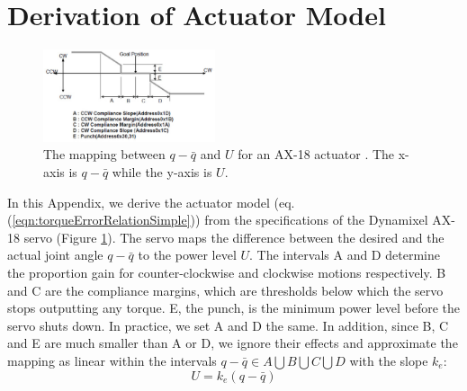 \section{Derivation of Actuator Model}

\begin{figure}[t]
\centering
\includegraphics[width=0.45\textwidth]{figures/ax18gain.eps}
\caption{The mapping between $q-\bar{q}$ and $U$ for an AX-18 actuator \cite{AX18:2015}. The x-axis is $q-\bar{q}$ while the y-axis is $U$.}
\vspace{-0.1in}
\label{fig:actuatorMap}
\end{figure}

In this Appendix, we derive the actuator model (eq.(\ref{eqn:torqueErrorRelationSimple})) from the specifications of the Dynamixel AX-18 servo (Figure \ref{fig:actuatorMap}). The servo maps the difference between the desired and the actual joint angle $q-\bar{q}$ to the power level $U$. The intervals A and D determine the proportion gain for counter-clockwise and clockwise motions respectively. B and C are the compliance margins, which are thresholds below which the servo stops outputting any torque. E, the punch, is the minimum power level before the servo shuts down. In practice, we set A and D the same. In addition, since B, C and E are much smaller than A or D, we ignore their effects and approximate the mapping as linear within the intervals $q-\bar{q}\in A\bigcup B\bigcup C\bigcup D$ with the slope $k_e$:
\begin{displaymath}
  U=k_e(q-\bar{q})
\end{displaymath}


